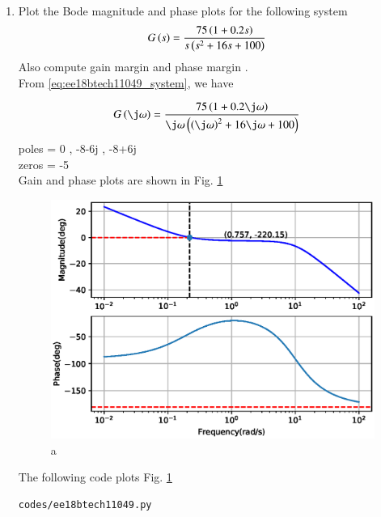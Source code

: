 \begin{enumerate}[label=\thesection.\arabic*.,ref=\thesection.\theenumi]

\item Plot the Bode magnitude and phase plots for the following system
\begin{align}
G\left(s\right) &= \frac{75\left(1+0.2s\right)}{s\left(s^2+16s+100\right)}
\label{eq:ee18btech11049_system}
\end{align}
Also compute gain margin and phase margin .
\\
\solution From  \eqref{eq:ee18btech11049_system}, we have 

\begin{align}
G\brak{\j\omega}&=\frac{75\brak{1+0.2\j\omega}}{\j\omega\brak{\brak{\j\omega}^2 + 16\j\omega+100} }
\end{align}
poles = 0 , -8-6j , -8+6j\\
zeros = -5\\
Gain and phase plots are shown in Fig.  \ref{fig:ee18btech11049} 
\begin{figure}[!h]
\centering
  \includegraphics[width=\columnwidth]{./figs/ee18btech11049.eps}
  \caption{a}
  \label{fig:ee18btech11049}
\end{figure}

The following code plots Fig. \ref{fig:ee18btech11049} 

\begin{lstlisting}
codes/ee18btech11049.py
\end{lstlisting}


\end{enumerate}
